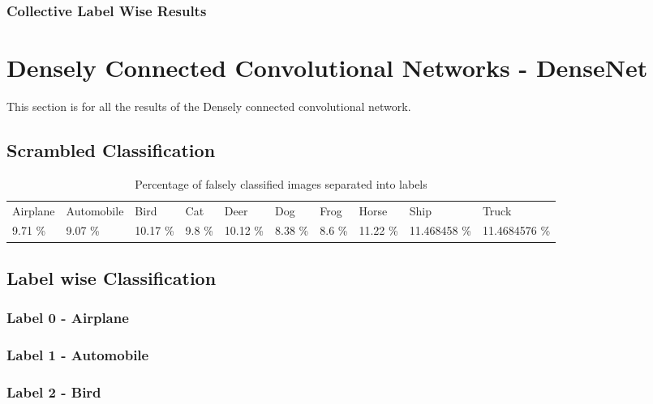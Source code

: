 \subsubsection{Collective Label Wise Results}
\FloatBarrier

\section{Densely Connected Convolutional Networks - DenseNet}
This section is for all the results of the Densely connected convolutional network.

\subsection{Scrambled Classification}

\FloatBarrier

\begin{table}[]
	\centering
	\caption{Percentage of falsely classified images separated into labels }
	\label{table:falseclas}
	\begin{tabular}{llllllllll}
		Airplane & Automobile & Bird     & Cat    & Deer     & Dog     & Frog   & Horse    & Ship         & Truck         \\
		9.71 \%  & 9.07 \%    & 10.17 \% & 9.8 \% & 10.12 \% & 8.38 \% & 8.6 \% & 11.22 \% & 11.468458 \% & 11.4684576 \%
	\end{tabular}
\end{table}
\FloatBarrier
\subsection{Label wise Classification}
\subsubsection{Label 0 - Airplane}
\FloatBarrier
\subsubsection{Label 1 - Automobile}
\FloatBarrier
\subsubsection{Label 2 - Bird}
\FloatBarrier
